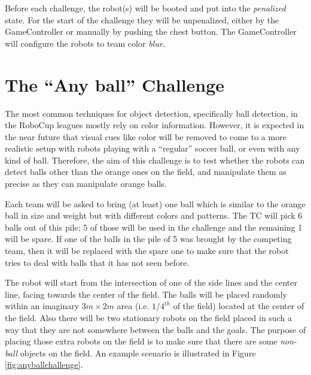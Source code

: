 \documentclass{article}
\begin{document}
Before each challenge, the robot(s) will be booted and put into the \emph{penalized} state. For the start of the challenge they will be unpenalized, either by the GameController or manually by pushing the chest button. The GameController will configure the robots to team color \emph{blue}.

\section{The ``Any ball'' Challenge}
\label{sec:anyball}

The most common techniques for object detection, specifically ball detection, in the RoboCup leagues mostly rely on color information. However, it is expected in the near future that visual cues like color will be removed to come to a more realistic setup with robots playing with a ``regular'' soccer ball, or even with any kind of ball. Therefore, the aim of this challenge is to test whether the robots can detect balls other than the orange ones on the field, and manipulate them as precise as they can manipulate orange balls.

Each team will be asked to bring (at least) one ball which is similar to the orange ball in size and weight but with different colors and patterns. The TC will pick 6 balls out of this pile; 5 of those will be used in the challenge and the remaining 1 will be spare. If one of the balls in the pile of 5 was brought by the competing team, then it will be replaced with the spare one to make sure that the robot tries to deal with balls that it has not seen before.

The robot will start from the intersection of one of the side lines and the center line, facing towards the center of the field. The balls will be placed randomly within an imaginary $3m \times 2m$ area (i.e. $1/4^{th}$ of the field) located at the center of the field. Also there will be two stationary robots on the field placed in such a way that they are not somewhere between the balls and the goals. The purpose of placing those extra robots on the field is to make sure that there are some \emph{non-ball} objects on the field. An example scenario is illustrated in Figure \ref{fig:anyballchallenge}.
\end{document}
